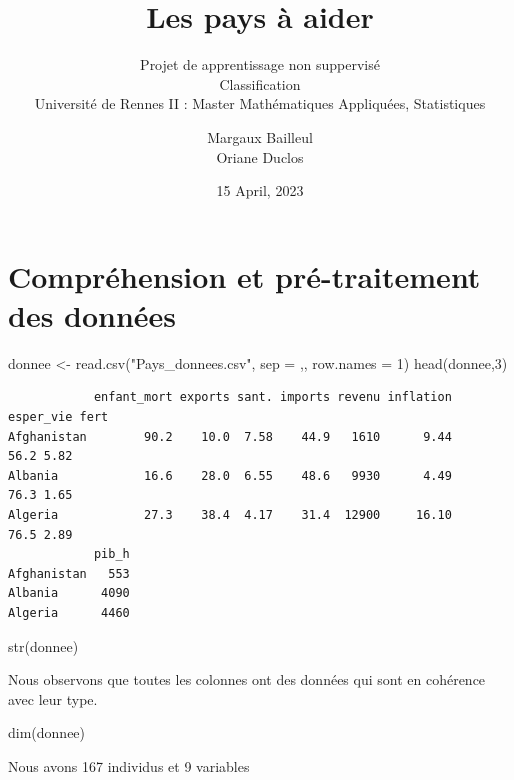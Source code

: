 \documentclass[
]{article}
\title{Les pays à aider}
\subtitle{Projet de apprentissage non suppervisé\\
Classification\\
Université de Rennes II : Master Mathématiques Appliquées, Statistiques}
\author{Margaux Bailleul\\
Oriane Duclos}
\date{15 April, 2023}
\newenvironment{Shaded}{}{}
\newcommand{\AttributeTok}[1]{#1}
\newcommand{\DecValTok}[1]{#1}
\newcommand{\FunctionTok}[1]{#1}
\newcommand{\NormalTok}[1]{#1}
\newcommand{\OtherTok}[1]{\textcolor[rgb]{1.00,0.25,0.00}{#1}}
\newcommand{\StringTok}[1]{\textcolor[rgb]{0.00,0.50,0.50}{#1}}
\begin{document}
\maketitle

{
\setcounter{tocdepth}{2}
\tableofcontents
}
\hypertarget{compruxe9hension-et-pruxe9-traitement-des-donnuxe9es}{%
\section{Compréhension et pré-traitement des
données}\label{compruxe9hension-et-pruxe9-traitement-des-donnuxe9es}}

\begin{Shaded}
\begin{Highlighting}[]
\NormalTok{donnee }\OtherTok{\textless{}{-}} \FunctionTok{read.csv}\NormalTok{(}\StringTok{"Pays\_donnees.csv"}\NormalTok{, }\AttributeTok{sep =} \StringTok{\textquotesingle{},\textquotesingle{}}\NormalTok{, }\AttributeTok{row.names =} \DecValTok{1}\NormalTok{)}
\FunctionTok{head}\NormalTok{(donnee,}\DecValTok{3}\NormalTok{)}
\end{Highlighting}
\end{Shaded}

\begin{verbatim}
            enfant_mort exports sant. imports revenu inflation esper_vie fert
Afghanistan        90.2    10.0  7.58    44.9   1610      9.44      56.2 5.82
Albania            16.6    28.0  6.55    48.6   9930      4.49      76.3 1.65
Algeria            27.3    38.4  4.17    31.4  12900     16.10      76.5 2.89
            pib_h
Afghanistan   553
Albania      4090
Algeria      4460
\end{verbatim}

\begin{Shaded}
\begin{Highlighting}[]
\FunctionTok{str}\NormalTok{(donnee)}
\end{Highlighting}
\end{Shaded}

Nous observons que toutes les colonnes ont des données qui sont en
cohérence avec leur type.

\begin{Shaded}
\begin{Highlighting}[]
\FunctionTok{dim}\NormalTok{(donnee)}
\end{Highlighting}
\end{Shaded}

Nous avons 167 individus et 9 variables
\end{document}
